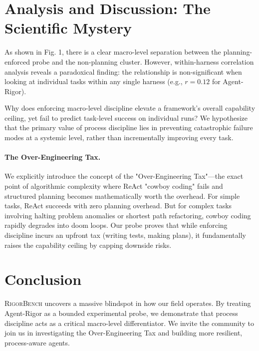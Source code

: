 \documentclass[letterpaper, 10 pt, conference]{ieeeconf}
\newcommand{\bench}{\textsc{RigorBench}}
\begin{document}
\section{Analysis and Discussion: The Scientific Mystery}
As shown in Fig. 1, there is a clear macro-level separation between the planning-enforced probe and the non-planning cluster. However, within-harness correlation analysis reveals a paradoxical finding: the relationship is non-significant when looking at individual tasks within any single harness (e.g., $r=0.12$ for Agent-Rigor). 

Why does enforcing macro-level discipline elevate a framework's overall capability ceiling, yet fail to predict task-level success on individual runs? We hypothesize that the primary value of process discipline lies in preventing catastrophic failure modes at a systemic level, rather than incrementally improving every task. 

\paragraph{The Over-Engineering Tax.} We explicitly introduce the concept of the "Over-Engineering Tax"---the exact point of algorithmic complexity where ReAct "cowboy coding" fails and structured planning becomes mathematically worth the overhead. For simple tasks, ReAct succeeds with zero planning overhead. But for complex tasks involving halting problem anomalies or shortest path refactoring, cowboy coding rapidly degrades into doom loops. Our probe proves that while enforcing discipline incurs an upfront tax (writing tests, making plans), it fundamentally raises the capability ceiling by capping downside risks.

\section{Conclusion}
\bench{} uncovers a massive blindspot in how our field operates. By treating Agent-Rigor as a bounded experimental probe, we demonstrate that process discipline acts as a critical macro-level differentiator. We invite the community to join us in investigating the Over-Engineering Tax and building more resilient, process-aware agents.
\end{document}
